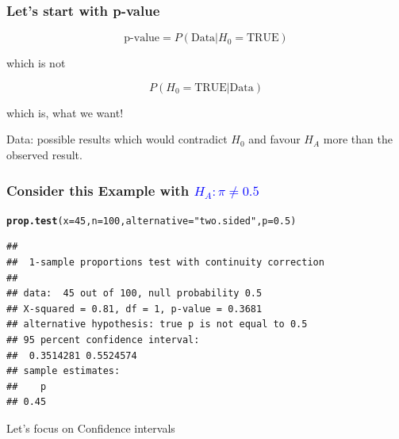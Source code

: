 \documentclass[12pt]{beamer}\usepackage[]{graphicx}\usepackage[]{color}
\makeatletter
\newcommand{\hlnum}[1]{\textcolor[rgb]{0.686,0.059,0.569}{#1}}%
\newcommand{\hlstr}[1]{\textcolor[rgb]{0.192,0.494,0.8}{#1}}%
\newcommand{\hlstd}[1]{\textcolor[rgb]{0.345,0.345,0.345}{#1}}%
\newcommand{\hlkwc}[1]{\textcolor[rgb]{0.333,0.667,0.333}{#1}}%
\newcommand{\hlkwd}[1]{\textcolor[rgb]{0.737,0.353,0.396}{\textbf{#1}}}%
\newenvironment{kframe}{%
 \def\at@end@of@kframe{}%
 \ifinner\ifhmode%
  \def\at@end@of@kframe{\end{minipage}}%
  \begin{minipage}{\columnwidth}%
 \fi\fi%
 \def\FrameCommand##1{\hskip\@totalleftmargin \hskip-\fboxsep
 \colorbox{shadecolor}{##1}\hskip-\fboxsep
     \hskip-\linewidth \hskip-\@totalleftmargin \hskip\columnwidth}%
 \MakeFramed {\advance\hsize-\width
   \@totalleftmargin\z@ \linewidth\hsize
   \@setminipage}}%
 {\par\unskip\endMakeFramed%
 \at@end@of@kframe}
\newenvironment{knitrout}{}{} %
\makeatother
\begin{document}

\begin{frame}\large
\frametitle{Let's start with p-value}

\begin{equation}\nonumber
 \text{p-value} = P(\text{Data}\vert H_0=\text{TRUE})
\end{equation}

 which is not 

\begin{equation}\nonumber
 P(H_0=\text{TRUE}\vert \text{Data})
\end{equation}

which is, what we want! \bigskip{}

Data: possible results which would contradict $H_0$ and favour $H_A$ more than the observed result.

\end{frame}


\begin{frame}[fragile]

\frametitle{Consider this Example with \textcolor{blue}{$H_A: \pi\neq 0.5$} }

\begin{knitrout}\small
{}\color{fgcolor}\begin{kframe}
\begin{alltt}
\hlkwd{prop.test}\hlstd{(}\hlkwc{x}\hlstd{=}\hlnum{45}\hlstd{,} \hlkwc{n}\hlstd{=}\hlnum{100}\hlstd{,} \hlkwc{alternative}\hlstd{=}\hlstr{"two.sided"}\hlstd{,} \hlkwc{p}\hlstd{=}\hlnum{0.5}\hlstd{)}
\end{alltt}
\begin{verbatim}
## 
## 	1-sample proportions test with continuity correction
## 
## data:  45 out of 100, null probability 0.5
## X-squared = 0.81, df = 1, p-value = 0.3681
## alternative hypothesis: true p is not equal to 0.5
## 95 percent confidence interval:
##  0.3514281 0.5524574
## sample estimates:
##    p 
## 0.45
\end{verbatim}
\end{kframe}
\end{knitrout}

Let's focus on Confidence intervals
\end{frame}

\end{document}
